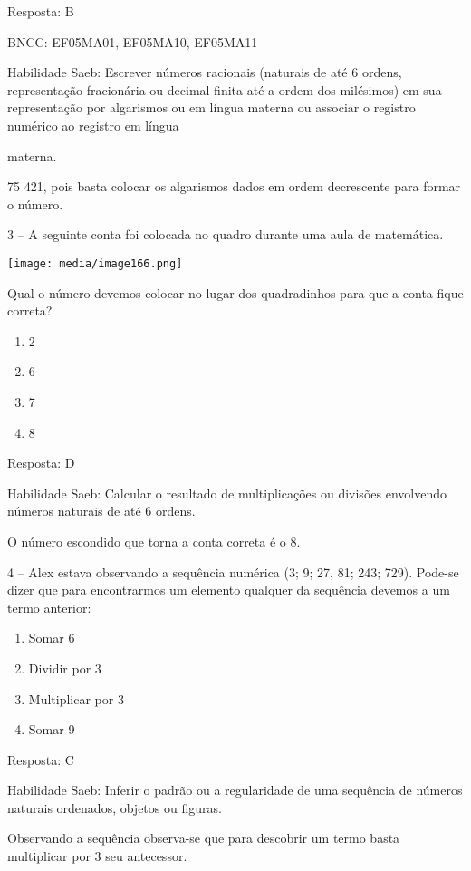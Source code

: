 Resposta: B

BNCC: EF05MA01, EF05MA10, EF05MA11

Habilidade Saeb: Escrever números racionais (naturais de até 6 ordens,
representação fracionária ou decimal finita até a ordem dos milésimos)
em sua representação por algarismos ou em língua materna ou associar o
registro numérico ao registro em língua

materna.

75 421, pois basta colocar os algarismos dados em ordem decrescente para
formar o número.

3 -- A seguinte conta foi colocada no quadro durante uma aula de
matemática.

\texttt{[image: media/image166.png]}

Qual o número devemos colocar no lugar dos quadradinhos para que a conta
fique correta?

\begin{enumerate}
\def\labelenumi{\alph{enumi})}
\item
  2
\item
  6
\item
  7
\item
  8
\end{enumerate}

Resposta: D

Habilidade Saeb: Calcular o resultado de multiplicações ou divisões
envolvendo números naturais de até 6 ordens.

O número escondido que torna a conta correta é o 8.

4 -- Alex estava observando a sequência numérica (3; 9; 27, 81; 243;
729). Pode-se dizer que para encontrarmos um elemento qualquer da
sequência devemos a um termo anterior:

\begin{enumerate}
\def\labelenumi{\alph{enumi})}
\item
  Somar 6
\item
  Dividir por 3
\item
  Multiplicar por 3
\item
  Somar 9
\end{enumerate}

Resposta: C

Habilidade Saeb: Inferir o padrão ou a regularidade de uma sequência de
números naturais ordenados, objetos ou figuras.

Observando a sequência observa-se que para descobrir um termo basta
multiplicar por 3 seu antecessor.

